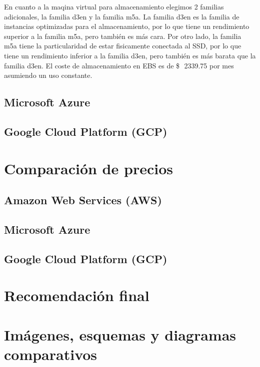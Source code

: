 \documentclass{article}
\newcommand{\usd}[1]{\SI{#1}[\$\ensuremath{\,}]{}}
\begin{document}
    En cuanto a la maqina virtual para almacenamiento elegimos 2 familias adicionales, la familia d3en y la familia m5a. La familia d3en es la familia de instancias optimizadas para el almacenamiento, por lo que tiene un rendimiento superior a la familia m5a, pero también es más cara. Por otro lado, la familia m5a tiene la particularidad de estar fisicamente conectada al SSD, por lo que tiene un rendimiento inferior a la familia d3en, pero también es más barata que la familia d3en.
    El coste de almacenamiento en EBS es de \usd{2339.75} por mes asumiendo un uso constante.



  \subsection{Microsoft Azure}
  \subsection{Google Cloud Platform (GCP)}

\section{Comparación de precios}
  \subsection{Amazon Web Services (AWS)}
  \subsection{Microsoft Azure}
  \subsection{Google Cloud Platform (GCP)}

\section{Recomendación final}

\section{Imágenes, esquemas y diagramas comparativos}


\printbibliography
\end{document}
